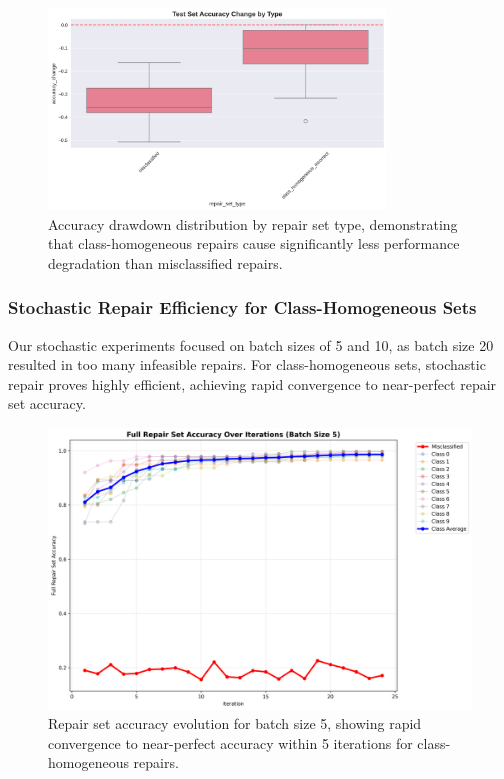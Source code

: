 \documentclass{article}
\begin{document}
\begin{figure}[h]
	\centering
	\includegraphics[width=0.8\textwidth]{results/one_shot_analysis/accuracy/accuracy_change_by_type.png}
	\caption{Accuracy drawdown distribution by repair set type, demonstrating that class-homogeneous repairs cause significantly less performance degradation than misclassified repairs.}
	\label{fig:accuracy_change_by_type}
\end{figure}

\subsubsection{Stochastic Repair Efficiency for Class-Homogeneous Sets}

Our stochastic experiments focused on batch sizes of 5 and 10, as batch size 20 resulted in too many infeasible repairs. For class-homogeneous sets, stochastic repair proves highly efficient, achieving rapid convergence to near-perfect repair set accuracy.

\begin{figure}[h]
	\centering
	\includegraphics[width=\textwidth]{results/stochastic_analysis/batch_iterations/repair_accuracy_batch_5.png}
	\caption{Repair set accuracy evolution for batch size 5, showing rapid convergence to near-perfect accuracy within 5 iterations for class-homogeneous repairs.}
	\label{fig:repair_convergence_batch_5}
\end{figure}
\end{document}
